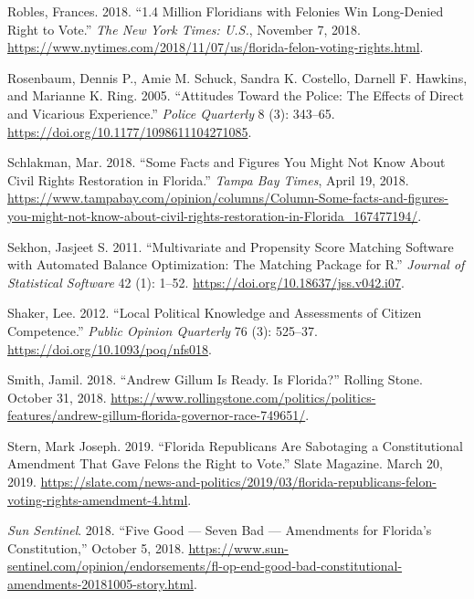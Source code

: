 \documentclass[
  12pt,
]{article}
\newlength{\cslhangindent}
\newenvironment{cslreferences}%
  {\setlength{\parindent}{0pt}%
  \everypar{\setlength{\hangindent}{\cslhangindent}}\ignorespaces}%
  {\par}
\begin{document}
\begin{cslreferences}
\leavevmode\hypertarget{ref-Robles2018}{}%
Robles, Frances. 2018. ``1.4 Million Floridians with Felonies Win Long-Denied Right to Vote.'' \emph{The New York Times: U.S.}, November 7, 2018. \url{https://www.nytimes.com/2018/11/07/us/florida-felon-voting-rights.html}.

\leavevmode\hypertarget{ref-Rosenbaum2005}{}%
Rosenbaum, Dennis P., Amie M. Schuck, Sandra K. Costello, Darnell F. Hawkins, and Marianne K. Ring. 2005. ``Attitudes Toward the Police: The Effects of Direct and Vicarious Experience.'' \emph{Police Quarterly} 8 (3): 343--65. \url{https://doi.org/10.1177/1098611104271085}.

\leavevmode\hypertarget{ref-Schlakman2018}{}%
Schlakman, Mar. 2018. ``Some Facts and Figures You Might Not Know About Civil Rights Restoration in Florida.'' \emph{Tampa Bay Times}, April 19, 2018. \url{https://www.tampabay.com/opinion/columns/Column-Some-facts-and-figures-you-might-not-know-about-civil-rights-restoration-in-Florida_167477194/}.

\leavevmode\hypertarget{ref-Sekhon2011}{}%
Sekhon, Jasjeet S. 2011. ``Multivariate and Propensity Score Matching Software with Automated Balance Optimization: The Matching Package for R.'' \emph{Journal of Statistical Software} 42 (1): 1--52. \url{https://doi.org/10.18637/jss.v042.i07}.

\leavevmode\hypertarget{ref-Shaker2012}{}%
Shaker, Lee. 2012. ``Local Political Knowledge and Assessments of Citizen Competence.'' \emph{Public Opinion Quarterly} 76 (3): 525--37. \url{https://doi.org/10.1093/poq/nfs018}.

\leavevmode\hypertarget{ref-Smith2018}{}%
Smith, Jamil. 2018. ``Andrew Gillum Is Ready. Is Florida?'' Rolling Stone. October 31, 2018. \url{https://www.rollingstone.com/politics/politics-features/andrew-gillum-florida-governor-race-749651/}.

\leavevmode\hypertarget{ref-Stern2019}{}%
Stern, Mark Joseph. 2019. ``Florida Republicans Are Sabotaging a Constitutional Amendment That Gave Felons the Right to Vote.'' Slate Magazine. March 20, 2019. \url{https://slate.com/news-and-politics/2019/03/florida-republicans-felon-voting-rights-amendment-4.html}.

\leavevmode\hypertarget{ref-SunSentinelEditorial2018}{}%
\emph{Sun Sentinel}. 2018. ``Five Good --- Seven Bad --- Amendments for Florida's Constitution,'' October 5, 2018. \url{https://www.sun-sentinel.com/opinion/endorsements/fl-op-end-good-bad-constitutional-amendments-20181005-story.html}.


\end{cslreferences}
\end{document}
